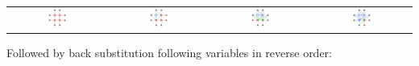 \documentclass{article}
\begin{document}
\begin{center}
\begin{tabular}{cccc}
\parbox{0.2\textwidth}{\includegraphics[width = 0.2\textwidth]{example_straight_forwards_back_substitution/example_straight_forwards_back_substitution_panel_1}} 
& \parbox{0.2\textwidth}{\includegraphics[width = 0.2\textwidth]{example_straight_forwards_back_substitution/example_straight_forwards_back_substitution_panel_2}} 
& \parbox{0.2\textwidth}{\includegraphics[width = 0.2\textwidth]{example_straight_forwards_back_substitution/example_straight_forwards_back_substitution_panel_3}} 
& \parbox{0.2\textwidth}{\includegraphics[width = 0.2\textwidth]{example_straight_forwards_back_substitution/example_straight_forwards_back_substitution_panel_4}} 
\end{tabular}
\end{center}

Followed by back substitution following variables in reverse order:
\end{document}
